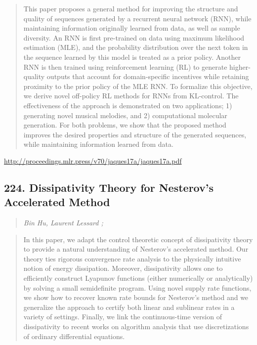 \documentclass{article}
\begin{document}
\begin{quote}
    This paper proposes a general method for improving the structure and quality of sequences generated by a recurrent neural network (RNN), while maintaining information originally learned from data, as well as sample diversity. An RNN is first pre-trained on data using maximum likelihood estimation (MLE), and the probability distribution over the next token in the sequence learned by this model is treated as a prior policy. Another RNN is then trained using reinforcement learning (RL) to generate higher-quality outputs that account for domain-specific incentives while retaining proximity to the prior policy of the MLE RNN. To formalize this objective, we derive novel off-policy RL methods for RNNs from KL-control. The effectiveness of the approach is demonstrated on two applications; 1) generating novel musical melodies, and 2) computational molecular generation. For both problems, we show that the proposed method improves the desired properties and structure of the generated sequences, while maintaining information learned from data.  \end{quote}

\href{http://proceedings.mlr.press/v70/jaques17a/jaques17a.pdf}{http://proceedings.mlr.press/v70/jaques17a/jaques17a.pdf}

\subsection{224. Dissipativity Theory for Nesterov’s Accelerated Method}

\begin{quote}
\footnotesize{\textit{Bin Hu, Laurent Lessard ;}}
\end{quote}

\begin{quote}
    In this paper, we adapt the control theoretic concept of dissipativity theory to provide a natural understanding of Nesterov’s accelerated method. Our theory ties rigorous convergence rate analysis to the physically intuitive notion of energy dissipation. Moreover, dissipativity allows one to efficiently construct Lyapunov functions (either numerically or analytically) by solving a small semidefinite program. Using novel supply rate functions, we show how to recover known rate bounds for Nesterov’s method and we generalize the approach to certify both linear and sublinear rates in a variety of settings. Finally, we link the continuous-time version of dissipativity to recent works on algorithm analysis that use discretizations of ordinary differential equations.  \end{quote}
\end{document}

